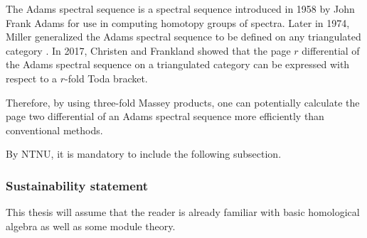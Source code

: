 The Adams spectral sequence is a spectral sequence introduced in 1958 by John Frank Adams for use in computing homotopy groups of spectra. Later in 1974, Miller generalized the Adams spectral sequence to be defined on any triangulated category \cite[Chapter I]{Miller_1975}. In 2017, Christen and Frankland \cite[Section 4, Section 6]{Christensen-Frankland_2017} showed that the page \( r \) differential of the Adams spectral sequence on a triangulated category can be expressed with respect to a \( r \)-fold Toda bracket.

Therefore, by using three-fold Massey products, one can potentially calculate the page two differential of an Adams spectral sequence more efficiently than conventional methods.

By NTNU, it is mandatory to include the following subsection.
\subsubsection{Sustainability statement}


This thesis will assume that the reader is already familiar with basic homological algebra as well as some module theory.
